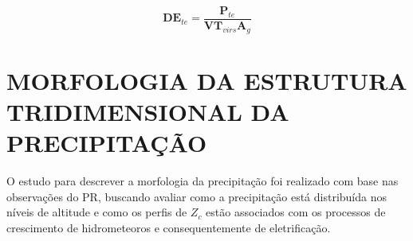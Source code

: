 



\begin{equation}
\mathbf{DE}_{te} = \frac{\mathbf{P}_{te}}{\mathbf{VT}_{virs} \mathbf{A}_g}    
\label{dete}
\end{equation}

\section{MORFOLOGIA DA ESTRUTURA TRIDIMENSIONAL DA PRECIPITAÇÃO}
\label{metodologiaPrec3D}

O estudo para descrever a morfologia da precipitação foi realizado com base nas observações do PR, buscando avaliar como a precipitação está distribuída nos níveis de altitude e como os perfis de $Z_c$ estão associados com os processos de crescimento de hidrometeoros e consequentemente de eletrificação.  


